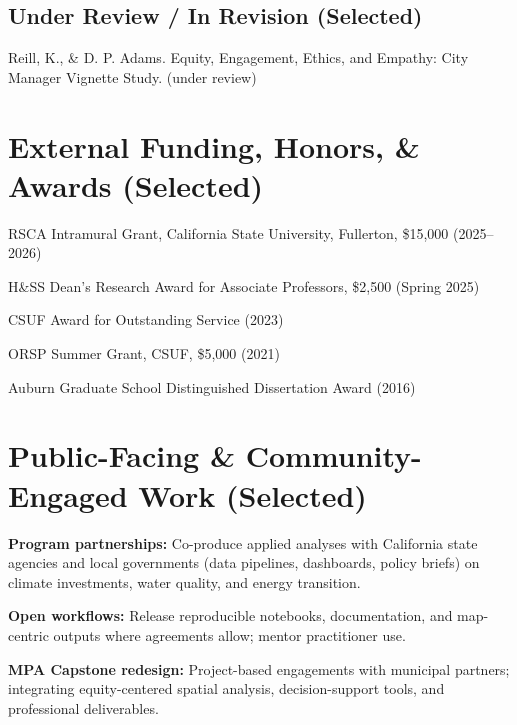 \documentclass[12pt,letterpaper]{article}
\renewenvironment{itemize}{
  \begin{list}{}{
    \setlength{\leftmargin}{1.2em}
    \setlength{\itemsep}{0.15em}
    \setlength{\parskip}{0pt}
    \setlength{\parsep}{0.15em}
  }
}{
  \end{list}
}
\begin{document}
\subsection*{Under Review / In Revision (Selected)}
\begin{itemize}
  \item Reill, K., \& D. P. Adams. Equity, Engagement, Ethics, and Empathy: City Manager Vignette Study. (under review)
\end{itemize}

\section*{External Funding, Honors, \& Awards (Selected)}
\begin{itemize}
  \item RSCA Intramural Grant, California State University, Fullerton, \$15,000 (2025--2026)
  \item H\&SS Dean's Research Award for Associate Professors, \$2,500 (Spring 2025)
  \item CSUF Award for Outstanding Service (2023)
  \item ORSP Summer Grant, CSUF, \$5,000 (2021)
  \item Auburn Graduate School Distinguished Dissertation Award (2016)
\end{itemize}

\section*{Public-Facing \& Community-Engaged Work (Selected)}
\begin{itemize}
  \item \textbf{Program partnerships:} Co-produce applied analyses with California state agencies and local governments (data pipelines, dashboards, policy briefs) on climate investments, water quality, and energy transition.
  \item \textbf{Open workflows:} Release reproducible notebooks, documentation, and map-centric outputs where agreements allow; mentor practitioner use.
  \item \textbf{MPA Capstone redesign:} Project-based engagements with municipal partners; integrating equity-centered spatial analysis, decision-support tools, and professional deliverables.
\end{itemize}
\end{document}
